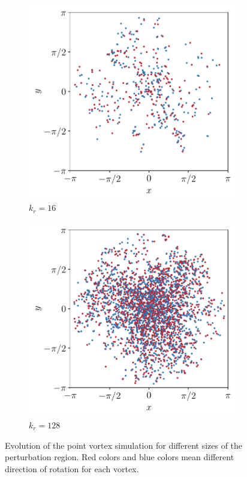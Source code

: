 \documentclass[../main.tex]{subfiles}
\begin{document}
\begin{figure}[ht]
	\centering
	\begin{subfigure}{0.44\textwidth}
		\centering
		\includegraphics[width=\textwidth]{images/pointvortices.R4.00440.pdf}
		\caption{$k_r = 16$}
	\end{subfigure}\hspace{0.04\textwidth}
	\begin{subfigure}{0.44\textwidth}
		\centering
		\includegraphics[width=\textwidth]{images/pointvortices.R32.00550.pdf}
		\caption{$k_r = 128$}
	\end{subfigure}
	\caption{Evolution of the point vortex simulation for different sizes of the perturbation region. Red colors and blue colors mean different direction of rotation for each vortex.}\label{fig:pointvortices}
\end{figure}
\end{document}
